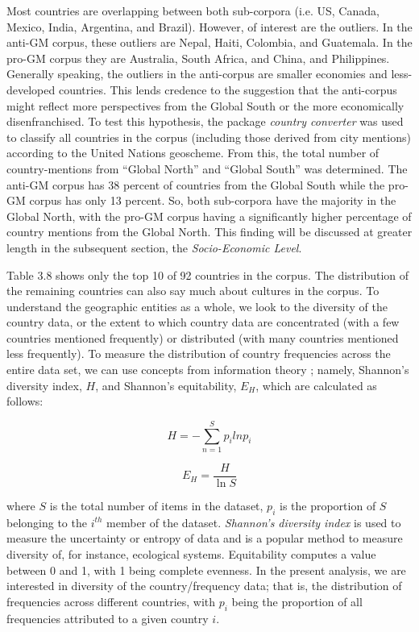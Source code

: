 Most countries are overlapping between both sub-corpora (i.e. US, Canada, Mexico, India, Argentina, and Brazil). However, of interest are the outliers. In the anti-GM corpus, these outliers are Nepal, Haiti, Colombia, and Guatemala. In the pro-GM corpus they are Australia, South Africa, and China, and Philippines. Generally speaking, the outliers in the anti-corpus are smaller economies and less-developed countries. This lends credence to the suggestion that the anti-corpus might reflect more perspectives from the Global South or the more economically disenfranchised. To test this hypothesis, the package \textit{country converter} \citep{Stadler2014} was used to classify all countries in the corpus (including those derived from city mentions) according to the United Nations geoscheme. From this, the total number of country-mentions from ``Global North'' and ``Global South'' was determined. The anti-GM corpus has 38 percent of countries from the Global South while the pro-GM corpus has only 13 percent. So, both sub-corpora have the majority in the Global North, with the pro-GM corpus having a significantly higher percentage of country mentions from the Global North. This finding will be discussed at greater length in the subsequent section, the \textit{Socio-Economic Level}.

Table 3.8 shows only the top 10 of 92 countries in the corpus. The distribution of the remaining countries can also say much about cultures in the corpus. To understand the geographic entities as a whole, we look to the diversity of the country data, or the extent to which country data are concentrated (with a few countries mentioned frequently) or distributed (with many countries mentioned less frequently). To measure the distribution of country frequencies across the entire data set, we can use concepts from information theory \citep{Shannon1949}; namely, Shannon's diversity index, \(H\), and Shannon's equitability, \(E_H\), which are calculated as follows:

$$H=-\sum_{n=1}^{S} p_i ln p_i$$

$$E_H=\frac{H}{\ln{S}}$$

where \(S\) is the total number of items in the dataset, \(p_i\) is the proportion of \(S\) belonging to the \(i^{th}\) member of the dataset. \textit{Shannon's diversity index} is used to measure the uncertainty or entropy of data and is a popular method to measure diversity of, for instance, ecological systems. Equitability computes a value between 0 and 1, with 1 being complete evenness. In the present analysis, we are interested in diversity of the country/frequency data; that is, the distribution of frequencies across different countries, with \(p_i\) being the proportion of all frequencies attributed to a given country \(i\).

